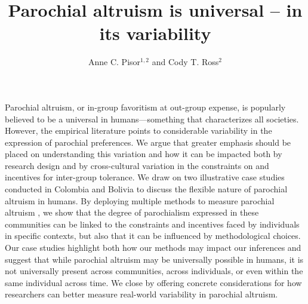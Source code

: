 \documentclass[bibauthoryear]{aa}
\begin{document}
 


   \title{Parochial altruism is universal -- in its variability}

\author{%
Anne C. Pisor$^{1,2}$ and Cody T. Ross$^{2}$
}

   \date{}

 
  \abstract
 {
Parochial altruism, or in-group favoritism at out-group expense, is popularly believed to be a universal in humans---something that characterizes all societies. However, the empirical literature points to considerable variability in the expression of parochial preferences. We argue that greater emphasis should be placed on understanding this variation and how it can be impacted both by research design and by cross-cultural variation in the constraints on and incentives for inter-group tolerance. We draw on two illustrative case studies conducted in Colombia and Bolivia to discuss the flexible nature of parochial altruism in humans. By deploying multiple methods to measure parochial altruism%
, we show that the degree of parochialism expressed in these communities can be linked to the constraints and incentives faced by individuals in specific contexts, but also that it can be influenced by methodological choices. Our case studies  highlight both how our methods may impact our inferences and suggest that while parochial altruism may be universally possible in humans, it is not universally present across communities, across individuals, or even within the same individual across time. We close by offering concrete considerations for how researchers can better measure real-world variability in parochial altruism.
 }

               
               \titlerunning{~}
\authorrunning{~  }%

   \maketitle
%
\end{document}
